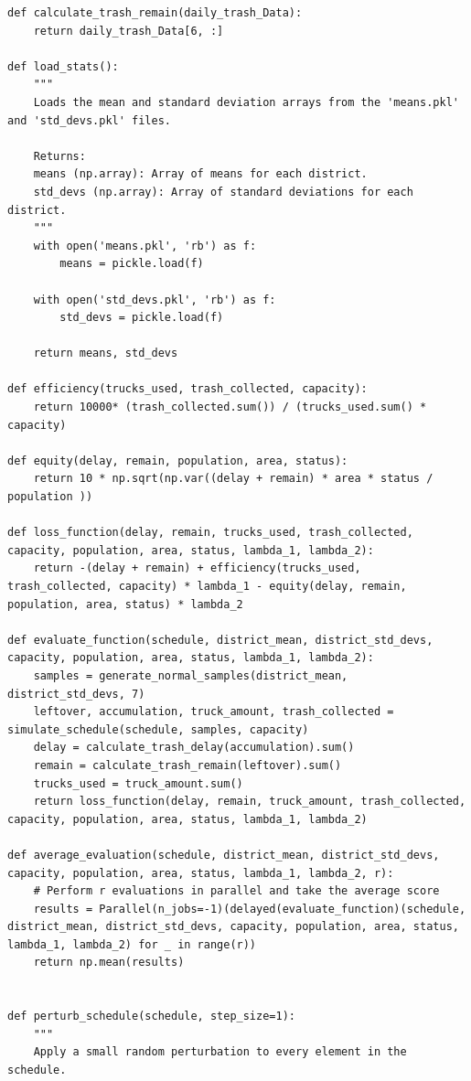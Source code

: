 \documentclass{article}
\begin{document}
\begin{verbatim}
def calculate_trash_remain(daily_trash_Data):
    return daily_trash_Data[6, :]

def load_stats():
    """
    Loads the mean and standard deviation arrays from the 'means.pkl' and 'std_devs.pkl' files.
    
    Returns:
    means (np.array): Array of means for each district.
    std_devs (np.array): Array of standard deviations for each district.
    """
    with open('means.pkl', 'rb') as f:
        means = pickle.load(f)
    
    with open('std_devs.pkl', 'rb') as f:
        std_devs = pickle.load(f)
    
    return means, std_devs

def efficiency(trucks_used, trash_collected, capacity):
    return 10000* (trash_collected.sum()) / (trucks_used.sum() * capacity)

def equity(delay, remain, population, area, status):
    return 10 * np.sqrt(np.var((delay + remain) * area * status / population ))

def loss_function(delay, remain, trucks_used, trash_collected, capacity, population, area, status, lambda_1, lambda_2):
    return -(delay + remain) + efficiency(trucks_used, trash_collected, capacity) * lambda_1 - equity(delay, remain, population, area, status) * lambda_2

def evaluate_function(schedule, district_mean, district_std_devs, capacity, population, area, status, lambda_1, lambda_2):
    samples = generate_normal_samples(district_mean, district_std_devs, 7)
    leftover, accumulation, truck_amount, trash_collected = simulate_schedule(schedule, samples, capacity)
    delay = calculate_trash_delay(accumulation).sum()
    remain = calculate_trash_remain(leftover).sum()
    trucks_used = truck_amount.sum()
    return loss_function(delay, remain, truck_amount, trash_collected, capacity, population, area, status, lambda_1, lambda_2)

def average_evaluation(schedule, district_mean, district_std_devs, capacity, population, area, status, lambda_1, lambda_2, r):
    # Perform r evaluations in parallel and take the average score
    results = Parallel(n_jobs=-1)(delayed(evaluate_function)(schedule, district_mean, district_std_devs, capacity, population, area, status, lambda_1, lambda_2) for _ in range(r))
    return np.mean(results)


def perturb_schedule(schedule, step_size=1):
    """
    Apply a small random perturbation to every element in the schedule.
    

\end{verbatim}
\end{document}
